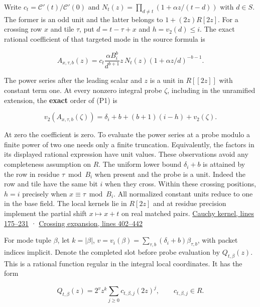 \documentclass[11pt,a4paper]{article}
\begin{document}
Write \(c_t=\mathcal C'(t)/\mathcal C'(0)\) and
\(N_t(z)=\prod_{d\ne t}(1+\alpha z/(t-d))\) with \(d\in S\). The former
is an odd unit and the latter belongs to \(1+(2z)R[2z]\). For a crossing
row \(x\) and tile \(\tau\), put \(d=t-\tau+x\) and \(h=v_2(d)\le i\).
The exact rational coefficient of that targeted mode in the source
formula is

\[
 A_{x,\tau,b}(z)=
 c_t\frac{\alpha B_i^b}{d^{b+1}}z\,N_t(z)
      (1+\alpha z/d)^{-b-1}.
 \tag{P1}
\]

The power series after the leading scalar and \(z\) is a unit in
\(R[[2z]]\) with constant term one. At every nonzero integral probe
\(\zeta\), including in the unramified extension, the \textbf{exact}
order of (P1) is

\[
 v_2(A_{x,\tau,b}(\zeta))
   =\delta_i+b+(b+1)(i-h)+v_2(\zeta).
 \tag{P2}
\]

At zero the coefficient is zero. To evaluate the power series at a probe
modulo a finite power of two one needs only a finite truncation.
Equivalently, the factors in its displayed rational expression have unit
values. These observations avoid any completeness assumption on \(R\).
The uniform lower bound \(\delta_i+b\) is attained by the row in residue
\(\tau\bmod B_i\) when present and the probe is a unit. Indeed the row
and tile have the same bit \(i\) when they cross. Within these crossing
positions, \(h=i\) precisely when \(x\equiv\tau\bmod B_i\). All
normalized constant units reduce to one in the base field. The local
kernels lie in \(R[2z]\) and at residue precision implement the partial
shift \(x\mapsto x+t\) on real matched pairs.
\href{https://github.com/openai/math/blob/main/preprints/The-Exponential-Time-Hypothesis-is-False-October-25-2026/build/quantitative-contraction.tex\#L175}{Cauchy
kernel, lines 175--231} ·
\href{https://github.com/openai/math/blob/main/preprints/The-Exponential-Time-Hypothesis-is-False-October-25-2026/build/quantitative-contraction.tex\#L402}{Crossing
expansion, lines 402--442}

For mode tuple \(\beta\), let \(k=|\beta|\),
\(v=v_i(\beta)=\sum_{\tau,b}(\delta_i+b)\beta_{\tau,b}\), with packet
indices implicit. Denote the completed slot before probe evaluation by
\(Q_{t,\beta}(z)\). This is a rational function regular in the integral
local coordinates. It has the form

\[
 Q_{t,\beta}(z)=2^v z^k\sum_{j\ge0}c_{t,\beta,j}(2z)^j,
 \qquad c_{t,\beta,j}\in R.
 \tag{P3}
\]
\end{document}
